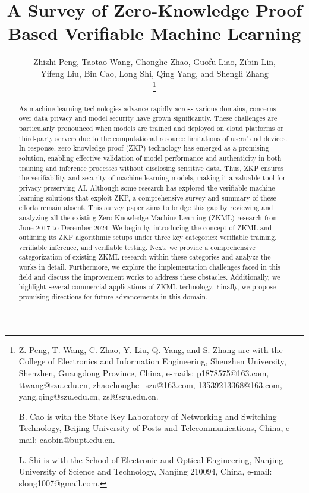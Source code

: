 \documentclass[journal]{IEEEtran}
\begin{document}
\title{A Survey of Zero-Knowledge Proof Based Verifiable Machine Learning}

\author{Zhizhi Peng, Taotao Wang, Chonghe Zhao, Guofu Liao, Zibin Lin, \\ Yifeng Liu,  Bin Cao, Long Shi, Qing Yang, and Shengli Zhang%

\thanks{Z. Peng, T. Wang, C. Zhao, Y. Liu, Q. Yang, and S. Zhang are with the College of Electronics and Information Engineering, Shenzhen University, Shenzhen, Guangdong Province, China, e-mails: {p1878575@163.com}, {ttwang@szu.edu.cn}, {zhaochonghe\_szu@163.com}, {13539213368@163.com}, {yang.qing@szu.edu.cn},  {zsl@szu.edu.cn}.

B. Cao is with the State Key Laboratory of Networking and Switching Technology, Beijing University of Posts and Telecommunications, China, e-mail: caobin@bupt.edu.cn.

L. Shi is with the School of Electronic and Optical Engineering, Nanjing University of Science and Technology, Nanjing 210094, China, e-mail: slong1007@gmail.com.

}%


}

\maketitle

\begin{abstract}
As machine learning technologies advance rapidly across various domains, concerns over data privacy and model security have grown significantly. These challenges are particularly pronounced when models are trained and deployed on cloud platforms or third-party servers due to the computational resource limitations of users' end devices. In response, zero-knowledge proof (ZKP) technology has emerged as a promising solution, enabling effective validation of model performance and authenticity in both training and inference processes without disclosing sensitive data. Thus, ZKP ensures the verifiability and security of machine learning models, making it a valuable tool for privacy-preserving AI. Although some research has explored the verifiable machine learning solutions that exploit ZKP, a comprehensive survey and summary of these efforts remain absent. This survey paper aims to bridge this gap by reviewing and analyzing all the existing Zero-Knowledge Machine Learning (ZKML) research from June 2017 to December 2024. We begin by introducing the concept of ZKML and outlining its ZKP algorithmic setups under three key categories: verifiable training, verifiable inference, and verifiable testing. Next, we provide a comprehensive categorization of existing ZKML research within these categories and analyze the works in detail. Furthermore, we explore the implementation challenges faced in this field and discuss the improvement works to address these obstacles. Additionally, we highlight several commercial applications of ZKML technology. Finally, we propose promising directions for future advancements in this domain.
\end{abstract}
\end{document}
